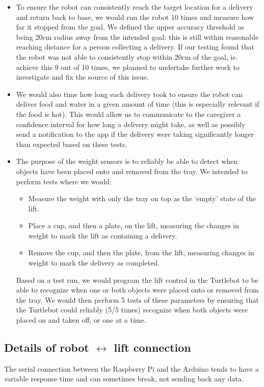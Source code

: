 \documentclass{article}
\begin{document}
\begin{itemize}
\item To ensure the robot can consistently reach the target location for a delivery and return back to base, we would run the robot 10 times and measure how far it stopped from the goal. We defined the upper accuracy threshold as being 20cm radius away from the intended goal: this is still within reasonable reaching distance for a person collecting a delivery. If our testing found that the robot was not able to consistently stop within 20cm of the goal, ie. achieve this 9 out of 10 times, we planned to undertake further work to investigate and fix the source of this issue. 
\item We would also time how long each delivery took to ensure the robot can deliver food and water in a given amount of time (this is especially relevant if the food is hot). This would allow us to communicate to the caregiver a confidence interval for how long a delivery might take, as well as possibly send a notification to the app if the delivery were taking significantly longer than expected based on these tests.
\item The purpose of the weight sensors is to reliably be able to detect when objects have been placed onto and removed from the tray. We intended to perform tests where we would:
  \begin{itemize}
    \item Measure the weight with only the tray on top as the `empty' state of the lift.
    \item Place a cup, and then a plate, on the lift, measuring the changes in weight to mark the lift as containing a delivery. 
    \item Remove the cup, and then the plate, from the lift, measuring changes in weight to mark the delivery as completed. 
  \end{itemize}
  Based on a test run, we would program the lift control in the Turtlebot to be able to recognize when one or both objects were placed onto or removed from the tray. We would then perform 5 tests of these parameters by ensuring that the Turtlebot could reliably (5/5 times) recognize when both objects were placed on and taken off, or one at a time. 
\end{itemize}

\subsection{Details of robot $\leftrightarrow$ lift connection}
\label{connection}
The serial connection between the Raspberry Pi and the Arduino tends to have a variable response time and can sometimes break, not sending back any data.
\end{document}
